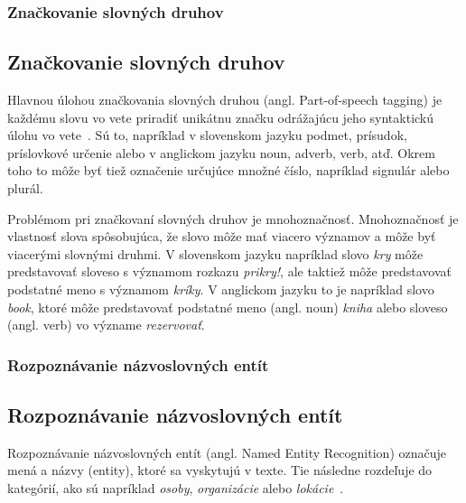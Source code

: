 %
%
{
	\subsubsection{Značkovanie slovných druhov}
}
{
	\subsection{Značkovanie slovných druhov}
}
\label{subsubsec:postagging}
Hlavnou úlohou značkovania slovných druhou (angl. Part-of-speech tagging) je každému slovu vo vete priradiť unikátnu značku odrážajúcu jeho syntaktickú úlohu vo vete~\cite{collobert2011}. Sú to, napríklad v slovenskom jazyku podmet, prísudok, príslovkové určenie alebo v anglickom jazyku noun, adverb, verb, atď. Okrem toho to môže byť tiež označenie určujúce množné číslo, napríklad signulár alebo plurál.

Problémom pri značkovaní slovných druhov je mnohoznačnosť. Mnohoznačnosť je vlastnosť slova spôsobujúca, že slovo môže mať viacero významov a môže byť viacerými slovnými druhmi. V slovenskom jazyku napríklad slovo \textit{kry} môže predstavovať sloveso s významom rozkazu \textit{prikry!}, ale taktiež môže predstavovať podstatné meno s významom \textit{kríky}. V anglickom jazyku to je napríklad slovo \textit{book}, ktoré môže predstavovať podstatné meno (angl. noun) \textit{kniha} alebo sloveso (angl. verb) vo význame \textit{rezervovať}.

%
%
{
	\subsubsection{Rozpoznávanie názvoslovných entít}
}
{
	\subsection{Rozpoznávanie názvoslovných entít}
}
\label{subsubsec:ner}
Rozpoznávanie názvoslovných entít (angl. Named Entity Recognition) označuje mená a názvy (entity), ktoré sa vyskytujú v texte. Tie následne rozdeľuje do kategórií, ako sú napríklad \textit{osoby}, \textit{organizácie} alebo \textit{lokácie}~\cite{collobert2011}.

